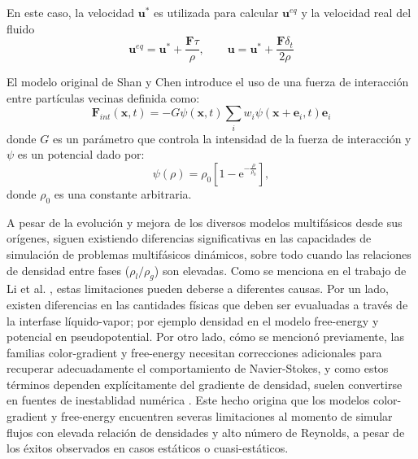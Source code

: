 En este caso, la velocidad $\bm{u}^*$ es utilizada para calcular $\bm{u}^{eq}$ y la velocidad real del fluido
\begin{equation}
	\bm{u}^{eq} = \bm{u}^* + \dfrac{\bm{F}\tau}{\rho}, \qquad \bm{u} = \bm{u}^* + \dfrac{\bm{F}\delta_t}{2\rho}
\end{equation}

El modelo original de Shan y Chen introduce el uso de una fuerza de interacci\'on entre part\'iculas vecinas definida como:
\begin{equation}
	\bm{F}_{int}(\bm{x},t) = -G\psi(\bm{x},t)\sum_i w_i \psi(\bm{x}+\bm{e}_i,t)\bm{e}_i
\end{equation}
donde $G$ es un par\'ametro que controla la intensidad de la fuerza de interacci\'on y $\psi$ es un potencial dado por:
\begin{equation}
	\psi(\rho) = \rho_0 \left[ 1-\mbox{e}^{-\frac{\rho}{\rho_0}} \right],
\end{equation}
donde $\rho_0$ es una constante arbitraria.

A pesar de la evoluci\'on y mejora de los diversos modelos multif\'asicos desde sus or\'igenes, siguen existiendo diferencias significativas en las capacidades de simulaci\'on de problemas multif\'asicos din\'amicos, sobre todo cuando las relaciones de densidad entre fases ($\rho_l/\rho_g$) son elevadas. Como se menciona en el trabajo de Li et al. \cite{li_lattice_2016}, estas limitaciones pueden deberse a diferentes causas. Por un lado, existen diferencias en las cantidades f\'isicas que deben ser evualuadas a trav\'es de la interfase l\'iquido-vapor; por ejemplo densidad en el modelo free-energy y potencial en pseudopotential. Por otro lado, c\'omo se mencion\'o previamente, las familias color-gradient y free-energy necesitan correcciones adicionales para recuperar adecuadamente el comportamiento de Navier-Stokes, y como estos t\'erminos dependen expl\'icitamente del gradiente de densidad, suelen convertirse en fuentes de inestablidad num\'erica \cite{leclaire_unsteady_2014,leclaire_enhanced_2013,huang_simulations_2013}. Este hecho origina que los modelos color-gradient y free-energy encuentren severas limitaciones al momento de simular flujos con elevada relaci\'on de densidades y alto n\'umero de Reynolds, a pesar de los \'exitos observados en casos est\'aticos o cuasi-est\'aticos.

